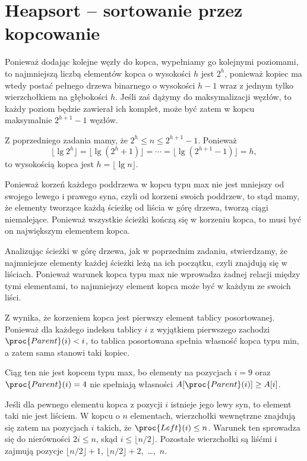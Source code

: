 \chapter{Heapsort -- sortowanie przez kopcowanie}


\exercise %
Ponieważ dodając kolejne węzły do kopca, wypełniamy go kolejnymi poziomami, to najmniejszą liczbą elementów kopca o wysokości $h$ jest $2^h$, ponieważ kopiec ma wtedy postać pełnego drzewa binarnego o wysokości $h-1$ wraz z jednym tylko wierzchołkiem na głębokości $h$. Jeśli zaś dążymy do maksymalizacji węzłów, to każdy poziom będzie zawierał ich komplet, może być zatem w kopcu maksymalnie $2^{h+1}-1$ węzłów.

\exercise %
Z poprzedniego zadania mamy, że $2^h\le n\le 2^{h+1}-1$. Ponieważ
\[
	\lfloor\lg2^h\rfloor = \lfloor\lg(2^h+1)\rfloor = \cdots = \lfloor\lg(2^{h+1}-1)\rfloor = h,
\]
to wysokością kopca jest $h=\lfloor\lg n\rfloor$.

\exercise %
Ponieważ korzeń każdego poddrzewa w kopcu typu max nie jest mniejszy od swojego lewego i prawego syna, czyli od korzeni swoich poddrzew, to stąd mamy, że elementy tworzące każdą ścieżkę od liścia w górę drzewa, tworzą ciągi niemalejące. Ponieważ wszystkie ścieżki kończą się w korzeniu kopca, to musi być on największym elementem kopca.

\exercise %
Analizując ścieżki w górę drzewa, jak w poprzednim zadaniu, stwierdzamy, że najmniejsze elementy każdej ścieżki leżą na ich początku, czyli znajdują się w liściach. Ponieważ warunek kopca typu max nie wprowadza żadnej relacji między tymi elementami, to najmniejszy element kopca może być w każdym ze swoich liści.

\exercise %
Z  wynika, że korzeniem kopca jest pierwszy element tablicy posortowanej. Ponieważ dla każdego indeksu tablicy $i$ z wyjątkiem pierwszego zachodzi $\proc{Parent}(i)<i$, to tablica posortowana spełnia własność kopca typu min, a zatem sama stanowi taki kopiec.

\exercise %
Ciąg ten nie jest kopcem typu max, bo elementy na pozycjach $i=9$ oraz $\proc{Parent}(i)=4$ nie spełniają własności $A[\proc{Parent}(i)]\ge A[i]$.

\exercise %
Jeśli dla pewnego elementu kopca z pozycji $i$ istnieje jego lewy syn, to element taki nie jest liściem. W kopcu o $n$ elementach, wierzchołki wewnętrzne znajdują się zatem na pozycjach $i$ takich, że $\proc{Left}(i)\le n$. Warunek ten sprowadza się do nierówności $2i\le n$, skąd $i\le\lfloor n/2\rfloor$. Pozostałe wierzchołki są liśćmi i zajmują pozycje $\lfloor n/2\rfloor+1$, $\lfloor n/2\rfloor+2$,~\dots,~$n$.

